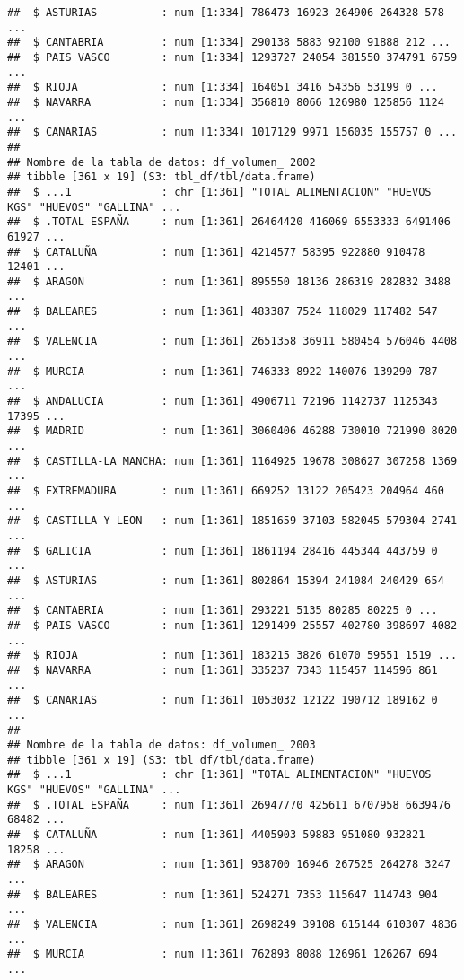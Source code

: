 \documentclass[
]{article}
\begin{document}
\begin{verbatim}
##  $ ASTURIAS          : num [1:334] 786473 16923 264906 264328 578 ...
##  $ CANTABRIA         : num [1:334] 290138 5883 92100 91888 212 ...
##  $ PAIS VASCO        : num [1:334] 1293727 24054 381550 374791 6759 ...
##  $ RIOJA             : num [1:334] 164051 3416 54356 53199 0 ...
##  $ NAVARRA           : num [1:334] 356810 8066 126980 125856 1124 ...
##  $ CANARIAS          : num [1:334] 1017129 9971 156035 155757 0 ...
##  
## Nombre de la tabla de datos: df_volumen_ 2002 
## tibble [361 x 19] (S3: tbl_df/tbl/data.frame)
##  $ ...1              : chr [1:361] "TOTAL ALIMENTACION" "HUEVOS KGS" "HUEVOS" "GALLINA" ...
##  $ .TOTAL ESPAÑA     : num [1:361] 26464420 416069 6553333 6491406 61927 ...
##  $ CATALUÑA          : num [1:361] 4214577 58395 922880 910478 12401 ...
##  $ ARAGON            : num [1:361] 895550 18136 286319 282832 3488 ...
##  $ BALEARES          : num [1:361] 483387 7524 118029 117482 547 ...
##  $ VALENCIA          : num [1:361] 2651358 36911 580454 576046 4408 ...
##  $ MURCIA            : num [1:361] 746333 8922 140076 139290 787 ...
##  $ ANDALUCIA         : num [1:361] 4906711 72196 1142737 1125343 17395 ...
##  $ MADRID            : num [1:361] 3060406 46288 730010 721990 8020 ...
##  $ CASTILLA-LA MANCHA: num [1:361] 1164925 19678 308627 307258 1369 ...
##  $ EXTREMADURA       : num [1:361] 669252 13122 205423 204964 460 ...
##  $ CASTILLA Y LEON   : num [1:361] 1851659 37103 582045 579304 2741 ...
##  $ GALICIA           : num [1:361] 1861194 28416 445344 443759 0 ...
##  $ ASTURIAS          : num [1:361] 802864 15394 241084 240429 654 ...
##  $ CANTABRIA         : num [1:361] 293221 5135 80285 80225 0 ...
##  $ PAIS VASCO        : num [1:361] 1291499 25557 402780 398697 4082 ...
##  $ RIOJA             : num [1:361] 183215 3826 61070 59551 1519 ...
##  $ NAVARRA           : num [1:361] 335237 7343 115457 114596 861 ...
##  $ CANARIAS          : num [1:361] 1053032 12122 190712 189162 0 ...
##  
## Nombre de la tabla de datos: df_volumen_ 2003 
## tibble [361 x 19] (S3: tbl_df/tbl/data.frame)
##  $ ...1              : chr [1:361] "TOTAL ALIMENTACION" "HUEVOS KGS" "HUEVOS" "GALLINA" ...
##  $ .TOTAL ESPAÑA     : num [1:361] 26947770 425611 6707958 6639476 68482 ...
##  $ CATALUÑA          : num [1:361] 4405903 59883 951080 932821 18258 ...
##  $ ARAGON            : num [1:361] 938700 16946 267525 264278 3247 ...
##  $ BALEARES          : num [1:361] 524271 7353 115647 114743 904 ...
##  $ VALENCIA          : num [1:361] 2698249 39108 615144 610307 4836 ...
##  $ MURCIA            : num [1:361] 762893 8088 126961 126267 694 ...

\end{verbatim}
\end{document}
